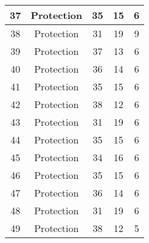 \documentclass[results.tex]{subfiles}
\begin{document}
\begin{center}
\begin{tabular}{| c || c | c | c | c |}
            \hline
            37                      & Protection                   & 35                     & 15                      & 6                    \\
            \hline
            38                      & Protection                   & 31                     & 19                      & 9                    \\
            \hline
            39                      & Protection                   & 37                     & 13                      & 6                    \\
            \hline
            40                      & Protection                   & 36                     & 14                      & 6                    \\
            \hline
            41                      & Protection                   & 35                     & 15                      & 6                    \\
            \hline
            42                      & Protection                   & 38                     & 12                      & 6                    \\
            \hline
            43                      & Protection                   & 31                     & 19                      & 6                    \\
            \hline
            44                      & Protection                   & 35                     & 15                      & 6                    \\
            \hline
            45                      & Protection                   & 34                     & 16                      & 6                    \\
            \hline
            46                      & Protection                   & 35                     & 15                      & 6                    \\
            \hline
            47                      & Protection                   & 36                     & 14                      & 6                    \\
            \hline
            48                      & Protection                   & 31                     & 19                      & 6                    \\
            \hline
            49                      & Protection                   & 38                     & 12                      & 5                    \\
            \hline
        \end{tabular}
    \end{center}
\end{document}

